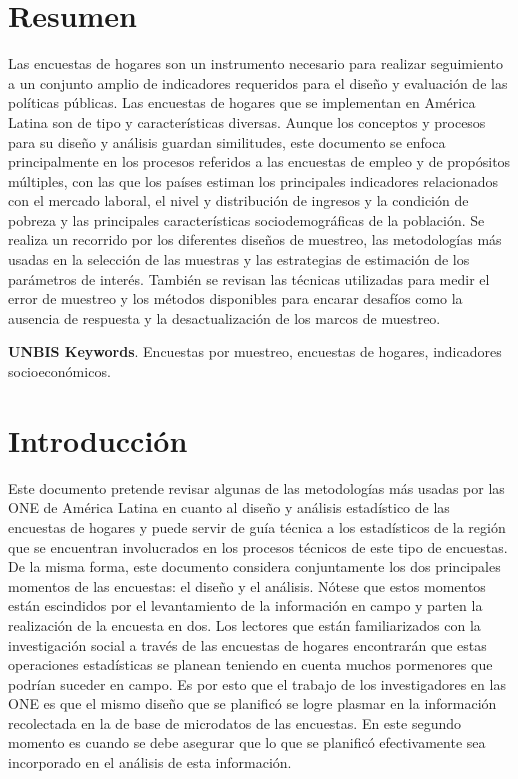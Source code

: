 \documentclass[
  12pt,
]{book}
\begin{document}
\hypertarget{resumen}{%
\chapter*{Resumen}\label{resumen}}

Las encuestas de hogares son un instrumento necesario para realizar seguimiento a un conjunto amplio de indicadores requeridos para el diseño y evaluación de las políticas públicas. Las encuestas de hogares que se implementan en América Latina son de tipo y características diversas. Aunque los conceptos y procesos para su diseño y análisis guardan similitudes, este documento se enfoca principalmente en los procesos referidos a las encuestas de empleo y de propósitos múltiples, con las que los países estiman los principales indicadores relacionados con el mercado laboral, el nivel y distribución de ingresos y la condición de pobreza y las principales características sociodemográficas de la población. Se realiza un recorrido por los diferentes diseños de muestreo, las metodologías más usadas en la selección de las muestras y las estrategias de estimación de los parámetros de interés. También se revisan las técnicas utilizadas para medir el error de muestreo y los métodos disponibles para encarar desafíos como la ausencia de respuesta y la desactualización de los marcos de muestreo.

\textbf{UNBIS Keywords}. Encuestas por muestreo, encuestas de hogares, indicadores socioeconómicos.

\hypertarget{introducciuxf3n}{%
\chapter{Introducción}\label{introducciuxf3n}}

Este documento pretende revisar algunas de las metodologías más usadas por las ONE de América Latina en cuanto al diseño y análisis estadístico de las encuestas de hogares y puede servir de guía técnica a los estadísticos de la región que se encuentran involucrados en los procesos técnicos de este tipo de encuestas. De la misma forma, este documento considera conjuntamente los dos principales momentos de las encuestas: el diseño y el análisis. Nótese que estos momentos están escindidos por el levantamiento de la información en campo y parten la realización de la encuesta en dos. Los lectores que están familiarizados con la investigación social a través de las encuestas de hogares encontrarán que estas operaciones estadísticas se planean teniendo en cuenta muchos pormenores que podrían suceder en campo. Es por esto que el trabajo de los investigadores en las ONE es que el mismo diseño que se planificó se logre plasmar en la información recolectada en la de base de microdatos de las encuestas. En este segundo momento es cuando se debe asegurar que lo que se planificó efectivamente sea incorporado en el análisis de esta información.
\end{document}
